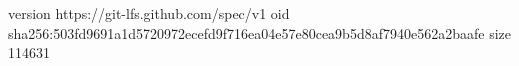 version https://git-lfs.github.com/spec/v1
oid sha256:503fd9691a1d5720972ecefd9f716ea04e57e80cea9b5d8af7940e562a2baafe
size 114631
